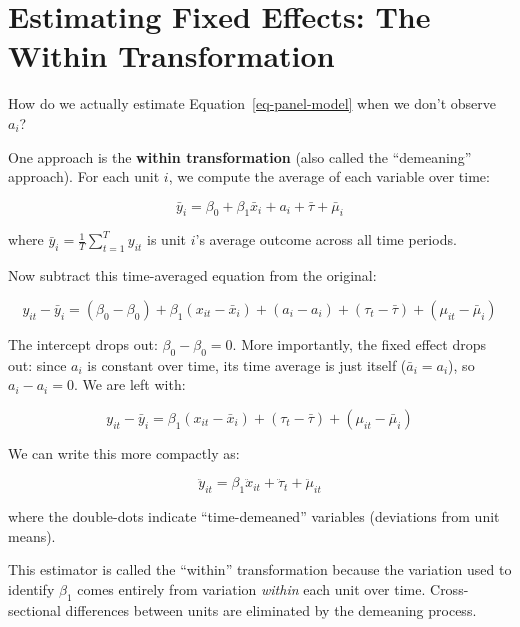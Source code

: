 \documentclass[
  letterpaper,
  DIV=11,
  numbers=noendperiod]{scrreprt}
\begin{document}
\section{Estimating Fixed Effects: The Within
Transformation}\label{estimating-fixed-effects-the-within-transformation}

How do we actually estimate Equation~\ref{eq-panel-model} when we don't
observe \(a_i\)?

One approach is the \textbf{within transformation} (also called the
``demeaning'' approach). For each unit \(i\), we compute the average of
each variable over time:

\[
\bar{y}_i = \beta_0 + \beta_1 \bar{x}_i + a_i + \bar{\tau} + \bar{\mu}_i
\]

where \(\bar{y}_i = \frac{1}{T}\sum_{t=1}^{T} y_{it}\) is unit \(i\)'s
average outcome across all time periods.

Now subtract this time-averaged equation from the original:

\[
y_{it} - \bar{y}_i = (\beta_0 - \beta_0) + \beta_1(x_{it} - \bar{x}_i) + (a_i - a_i) + (\tau_t - \bar{\tau}) + (\mu_{it} - \bar{\mu}_i)
\]

The intercept drops out: \(\beta_0 - \beta_0 = 0\). More importantly,
the fixed effect drops out: since \(a_i\) is constant over time, its
time average is just itself (\(\bar{a}_i = a_i\)), so \(a_i - a_i = 0\).
We are left with:

\[
y_{it} - \bar{y}_i = \beta_1(x_{it} - \bar{x}_i) + (\tau_t - \bar{\tau}) + (\mu_{it} - \bar{\mu}_i)
\]

We can write this more compactly as:

\[
\ddot{y}_{it} = \beta_1 \ddot{x}_{it} + \ddot{\tau}_t + \ddot{\mu}_{it}
\]

where the double-dots indicate ``time-demeaned'' variables (deviations
from unit means).

\begin{tcolorbox}[enhanced jigsaw, arc=.35mm, bottomrule=.15mm, bottomtitle=1mm, breakable, colback=white, colbacktitle=quarto-callout-note-color!10!white, colframe=quarto-callout-note-color-frame, coltitle=black, left=2mm, leftrule=.75mm, opacityback=0, opacitybacktitle=0.6, rightrule=.15mm, title=\textcolor{quarto-callout-note-color}{\faInfo}\hspace{0.5em}{Why ``Within'' Transformation?}, titlerule=0mm, toprule=.15mm, toptitle=1mm]

This estimator is called the ``within'' transformation because the
variation used to identify \(\beta_1\) comes entirely from variation
\emph{within} each unit over time. Cross-sectional differences between
units are eliminated by the demeaning process.

\end{tcolorbox}
\end{document}
